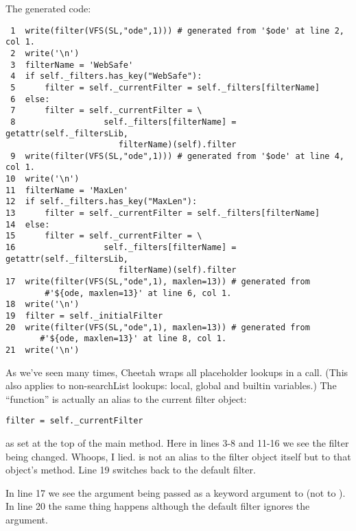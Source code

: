 The generated code:
\begin{verbatim}
 1  write(filter(VFS(SL,"ode",1))) # generated from '$ode' at line 2, col 1.
 2  write('\n')
 3  filterName = 'WebSafe'
 4  if self._filters.has_key("WebSafe"):
 5      filter = self._currentFilter = self._filters[filterName]
 6  else:
 7      filter = self._currentFilter = \
 8                  self._filters[filterName] = getattr(self._filtersLib, 
                       filterName)(self).filter
 9  write(filter(VFS(SL,"ode",1))) # generated from '$ode' at line 4, col 1.
10  write('\n')
11  filterName = 'MaxLen'
12  if self._filters.has_key("MaxLen"):
13      filter = self._currentFilter = self._filters[filterName]
14  else:
15      filter = self._currentFilter = \
16                  self._filters[filterName] = getattr(self._filtersLib, 
                       filterName)(self).filter
17  write(filter(VFS(SL,"ode",1), maxlen=13)) # generated from 
        #'${ode, maxlen=13}' at line 6, col 1.
18  write('\n')
19  filter = self._initialFilter
20  write(filter(VFS(SL,"ode",1), maxlen=13)) # generated from 
       #'${ode, maxlen=13}' at line 8, col 1.
21  write('\n')
\end{verbatim}

As we've seen many times, Cheetah wraps all placeholder lookups in a
 call.  (This also applies to non-searchList lookups: local,
global and builtin variables.)  The \code{filter} ``function''
is actually an alias to the current filter object:
\begin{verbatim}
filter = self._currentFilter
\end{verbatim}
as set at the top of the main method.  Here in lines 3-8 and 11-16 we see
the filter being changed.  Whoops, I lied.   is not an alias to
the filter object itself but to that object's \code{.filter} method.  Line 19
switches back to the default filter.  

In line 17 we see the  argument being passed as a keyword
argument to  (not to ).  In line 20 the same thing
happens although the default filter ignores the argument.

